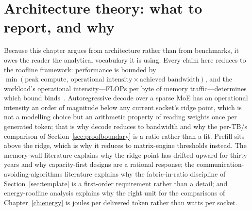 \section{Architecture theory: what to report, and why}
\label{sec:archtheory}

Because this chapter argues from architecture rather than from benchmarks, it owes the reader the analytical vocabulary it is using. Every claim here reduces to the roofline framework: performance is bounded by $\min(\text{peak compute},\ \text{operational intensity}\times\text{achieved bandwidth})$, and the workload's operational intensity---FLOPs per byte of memory traffic---determines which bound binds~\cite{roofline2009}. Autoregressive decode over a sparse MoE has an operational intensity an order of magnitude below any current socket's ridge point, which is not a modelling choice but an arithmetic property of reading weights once per generated token; that is why decode reduces to bandwidth and why the per-TB/s comparison of Section~\ref{sec:proofboundary} is a ratio rather than a fit. Prefill sits above the ridge, which is why it reduces to matrix-engine thresholds instead. The memory-wall literature explains why the ridge point has drifted upward for thirty years and why capacity-first designs are a rational response; the communication-avoiding-algorithms literature explains why the fabric-in-ratio discipline of Section~\ref{sec:template} is a first-order requirement rather than a detail; and energy-roofline analysis explains why the right unit for the comparisons of Chapter~\ref{ch:energy} is joules per delivered token rather than watts per socket.

